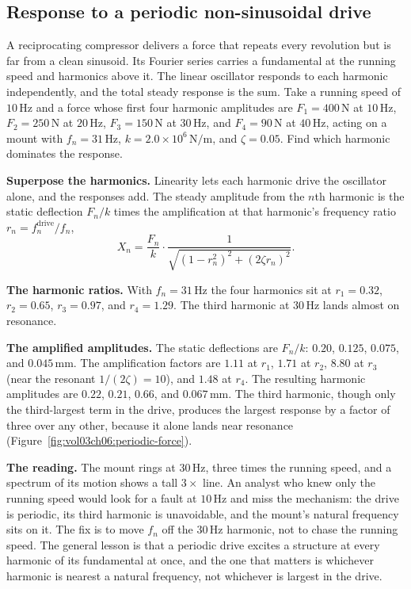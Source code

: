 \subsection{Response to a periodic non-sinusoidal drive}

A reciprocating compressor delivers a force that repeats every
revolution but is far from a clean sinusoid. Its Fourier series carries
a fundamental at the running speed and harmonics above it. The linear
oscillator responds to each harmonic independently, and the total steady
response is the sum. Take a running speed of $10\,\si{\hertz}$ and a
force whose first four harmonic amplitudes are $F_1 = 400\,\text{N}$ at
$10\,\si{\hertz}$, $F_2 = 250\,\text{N}$ at $20\,\si{\hertz}$, $F_3 =
150\,\text{N}$ at $30\,\si{\hertz}$, and $F_4 = 90\,\text{N}$ at $40\,
\si{\hertz}$, acting on a mount with $f_n = 31\,\si{\hertz}$, $k =
2.0\times 10^6\,\si{\newton\per\meter}$, and $\zeta = 0.05$. Find which
harmonic dominates the response.

\textbf{Superpose the harmonics.} Linearity lets each harmonic drive the
oscillator alone, and the responses add. The steady amplitude from the
$n$th harmonic is the static deflection $F_n/k$ times the amplification
at that harmonic's frequency ratio $r_n = f_n^{\text{drive}}/f_n$,
\[
X_n = \frac{F_n}{k}\cdot\frac{1}{\sqrt{(1 - r_n^2)^2 + (2\zeta r_n)^2}}.
\]

\textbf{The harmonic ratios.} With $f_n = 31\,\si{\hertz}$ the four
harmonics sit at $r_1 = 0.32$, $r_2 = 0.65$, $r_3 = 0.97$, and $r_4 =
1.29$. The third harmonic at $30\,\si{\hertz}$ lands almost on
resonance.

\textbf{The amplified amplitudes.} The static deflections are $F_n/k$:
$0.20$, $0.125$, $0.075$, and $0.045\,\si{\milli\meter}$. The
amplification factors are $1.11$ at $r_1$, $1.71$ at $r_2$, $8.80$ at
$r_3$ (near the resonant $1/(2\zeta) = 10$), and $1.48$ at $r_4$. The
resulting harmonic amplitudes are $0.22$, $0.21$, $0.66$, and $0.067\,
\si{\milli\meter}$. The third harmonic, though only the third-largest
term in the drive, produces the largest response by a factor of three
over any other, because it alone lands near resonance
(Figure~\ref{fig:vol03ch06:periodic-force}).

\textbf{The reading.} The mount rings at $30\,\si{\hertz}$, three times
the running speed, and a spectrum of its motion shows a tall $3\times$
line. An analyst who knew only the running speed would look for a fault
at $10\,\si{\hertz}$ and miss the mechanism: the drive is periodic, its
third harmonic is unavoidable, and the mount's natural frequency sits on
it. The fix is to move $f_n$ off the $30\,\si{\hertz}$ harmonic, not to
chase the running speed. The general lesson is that a periodic drive
excites a structure at every harmonic of its fundamental at once, and
the one that matters is whichever harmonic is nearest a natural
frequency, not whichever is largest in the drive.

